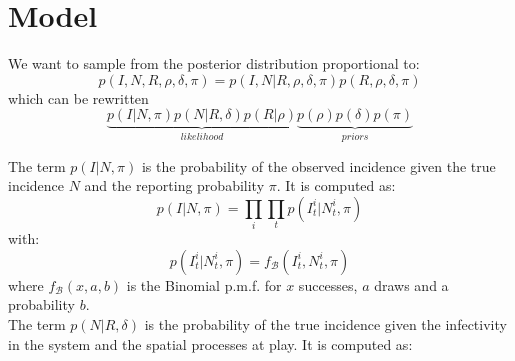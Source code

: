 \documentclass[a4paper,11pt]{article}
\begin{document}
\section{Model}

We want to sample from the posterior distribution proportional to:
\begin{equation}
 p(I, N, R, \rho, \delta, \pi) = p(I, N | R, \rho, \delta, \pi)  
 p(R, \rho, \delta, \pi)
\end{equation}
which can be rewritten
\begin{equation}
\underbrace{p(I | N, \pi) p(N | R, \delta) p(R | \rho) }_{likelihood} 
\underbrace{p(\rho) p(\delta) p(\pi)}_{priors} 
\end{equation}

The term $p(I | N, \pi)$ is the probability of the observed incidence given the 
true incidence $N$ and the reporting probability $\pi$.
It is computed as:
\begin{equation}
p(I | N, \pi) = \prod_{i}\prod_{t} p(I_t^i| N_t^i, \pi)
\end{equation}
with:
\begin{equation}
p(I_t^i| N_t^i, \pi) = f_\mathcal{B}(I_t^i, N_t^i, \pi)
\end{equation}
where $f_\mathcal{B}(x,a,b)$ is the Binomial p.m.f. for $x$ successes, $a$ draws 
and a probability $b$.
\\

The term $p(N | R, \delta)$ is the probability of the true incidence 
given the infectivity in the system and the spatial processes at play.
It is computed as:
\end{document}
